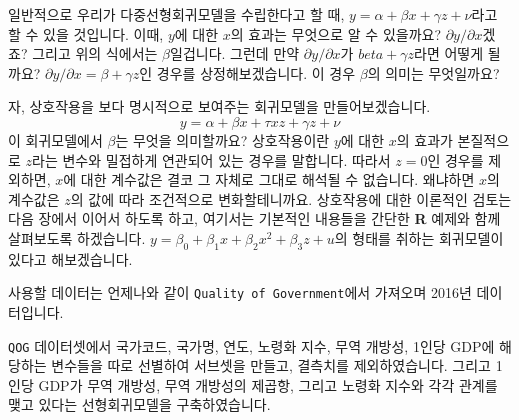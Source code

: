 \documentclass[
]{book}
\newenvironment{Shaded}{\begin{snugshade}}{\end{snugshade}}
\newcommand{\DataTypeTok}[1]{\textcolor[rgb]{0.13,0.29,0.53}{#1}}
\newcommand{\DecValTok}[1]{\textcolor[rgb]{0.00,0.00,0.81}{#1}}
\newcommand{\KeywordTok}[1]{\textcolor[rgb]{0.13,0.29,0.53}{\textbf{#1}}}
\newcommand{\NormalTok}[1]{#1}
\newcommand{\OperatorTok}[1]{\textcolor[rgb]{0.81,0.36,0.00}{\textbf{#1}}}
\newcommand{\StringTok}[1]{\textcolor[rgb]{0.31,0.60,0.02}{#1}}
\begin{document}
일반적으로 우리가 다중선형회귀모델을 수립한다고 할 때, \(y = \alpha + \beta x + \gamma z + \nu\)라고 할 수 있을 것입니다. 이때, \(y\)에 대한 \(x\)의 효과는 무엇으로 알 수 있을까요? \(\partial y/\partial x\)겠죠? 그리고 위의 식에서는 \(\beta\)일겁니다. 그런데 만약 \(\partial y/\partial x\)가 \(beta + \gamma z\)라면 어떻게 될까요? \(\partial y/\partial x = \beta + \gamma z\)인 경우를 상정해보겠습니다. 이 경우 \(\beta\)의 의미는 무엇일까요?

자, 상호작용을 보다 명시적으로 보여주는 회귀모델을 만들어보겠습니다.
\[y = \alpha + \beta x + \tau xz + \gamma z + \nu\]
이 회귀모델에서 \(\beta\)는 무엇을 의미할까요? 상호작용이란 \(y\)에 대한 \(x\)의 효과가 본질적으로 \(z\)라는 변수와 밀접하게 연관되어 있는 경우를 말합니다. 따라서 \(z=0\)인 경우를 제외하면, \(x\)에 대한 계수값은 결코 그 자체로 그대로 해석될 수 없습니다. 왜냐하면 \(x\)의 계수값은 \(z\)의 값에 따라 조건적으로 변화할테니까요. 상호작용에 대한 이론적인 검토는 다음 장에서 이어서 하도록 하고, 여기서는 기본적인 내용들을 간단한 \textbf{R} 예제와 함께 살펴보도록 하겠습니다. \(y = \beta_0 + \beta_1x + \beta_2x^2 + \beta_3z + u\)의 형태를 취하는 회귀모델이 있다고 해보겠습니다.

사용할 데이터는 언제나와 같이 \texttt{Quality\ of\ Government}에서 가져오며 2016년 데이터입니다.

\begin{Shaded}
\end{Shaded}

\texttt{QOG} 데이터셋에서 국가코드, 국가명, 연도, 노령화 지수, 무역 개방성, 1인당 GDP에 해당하는 변수들을 따로 선별하여 서브셋을 만들고, 결측치를 제외하였습니다. 그리고 1인당 GDP가 무역 개방성, 무역 개방성의 제곱항, 그리고 노령화 지수와 각각 관계를 맺고 있다는 선형회귀모델을 구축하였습니다.
\end{document}
